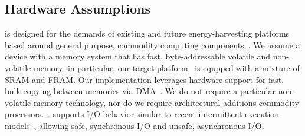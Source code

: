\subsection{Hardware Assumptions}
\label{sec:background_hardware}

\sys is designed for the demands of existing and future energy-harvesting
platforms based around general purpose, commodity computing
components~\cite{wisp,msp430datasheet}.  
%
We assume a device with a memory system that has fast, byte-addressable
volatile and non-volatile memory; in particular, our target
platform~\cite{wisp} is equpped with a mixture of SRAM and FRAM.
%
Our implementation leverages hardware support for fast, bulk-copying between
memories via DMA~\cite{msp430datasheet}.
%
We do not require a particular non-volatile memory technology, nor do we
require architectural additions commodity
processors.~\cite{su_date_2017,ratchet,quickrecall,nvp}. 
%
\sys supports I/O behavior similar to recent intermittent execution
models~\cite{alpaca,chain}, allowing safe, synchronous I/O and unsafe,
asynchronous I/O.

